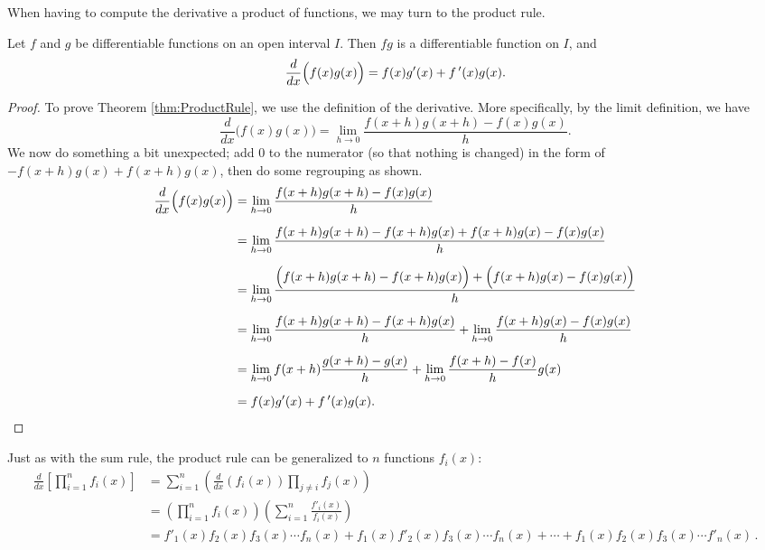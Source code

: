 \fi 
When having to compute the derivative a product of functions, we may turn to the product rule. 


\begin{theorem}\label{thm:ProductRule}
Let $f$ and $g$ be differentiable functions on an open interval $I$. Then $fg$ is a differentiable function on $I$, and
 $$\frac{d}{dx}\Big(f(x)g(x)\Big) = f(x)g'(x) + f\,'(x)g(x).$$
\end{theorem}

\ifcourse
\ifanalysis

\begin{proof}
To prove Theorem \ref{thm:ProductRule}, we use the definition of the derivative. More specifically, by the limit definition, we have 
		$$\frac{d}{dx}\Big(f(x)g(x)\Big) =\lim_{h\to0} \frac{f(x+h)g(x+h)-f(x)g(x)}{h}.$$ 
	We now do something a bit unexpected; add 0 to the numerator (so that nothing is changed) in the form of $-f(x+h)g(x)+f(x+h)g(x)$, then do some regrouping as shown.
		\begin{align*}
		\frac{d}{dx}\Big(f(x)g(x)\Big) &=\lim_{h\to0} \frac{f(x+h)g(x+h)-f(x)g(x)}{h}\\[0.2cm]
																	&=	\lim_{h\to0} \frac{f(x+h)g(x+h)-f(x+h)g(x)+f(x+h)g(x)-f(x)g(x)}{h} \\[0.2cm]
																	&=	\lim_{h\to0} \frac{\Big(f(x+h)g(x+h)-f(x+h)g(x)\Big)+\Big(f(x+h)g(x)-f(x)g(x)\Big)}{h}\\[0.2cm]
																	&=	\lim_{h\to0} \frac{f(x+h)g(x+h)-f(x+h)g(x)}{h}+\lim_{h\to0}\frac{f(x+h)g(x)-f(x)g(x)}{h}\\[0.2cm]
																	&=\lim_{h\to0} f(x+h)\frac{g(x+h)-g(x)}{h}+\lim_{h\to0}\frac{f(x+h)-f(x)}{h}g(x)\\[0.2cm]
																	&=f(x)g'(x) + f\,'(x)g(x).
		\end{align*}
\end{proof}


Just as with the sum rule, the product rule can be generalized to $n$ functions $f_i(x)$: 
\allowdisplaybreaks
\begin{align*}
\displaystyle {\frac {d}{dx}}\left[\prod _{i=1}^{n}f_{i}(x)\right]&=\sum _{i=1}^{n}\left({\frac {d}{dx}} (f_{i}(x))\prod _{j\neq i}f_{j}(x)\right)\\
&=\left(\prod _{i=1}^{n}f_{i}(x)\right)\left(\sum _{i=1}^{n}{\frac {f'_{i}(x)}{f_{i}(x)}}\right)\\
&= f'_1(x)f_2(x)f_3(x)\cdots f_n(x)+f_1(x)f'_2(x)f_3(x)\cdots f_n(x)+\cdots+f_1(x)f_2(x)f_3(x)\cdots f'_n(x)\,.
\end{align*}


